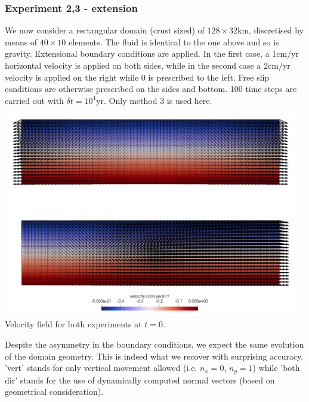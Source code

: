 \subsubsection*{Experiment 2,3 - extension}

We now consider a rectangular domain (crust sized) of $128\times32$km, discretised by means of $40\times10$ elements.
The fluid is identical to the one above and so is gravity. 
Extensional boundary conditions are applied. In the first case, a 1cm/yr horizontal velocity is applied on both sides, while in the second case a 2cm/yr velocity is applied on the right while 0 is prescribed to the left. Free slip conditions are otherwise prescribed on the sides and bottom. 100 time steps are carried out with $\delta t=10^4$yr. Only method 3 is used here.

\begin{center}
\includegraphics[width=13cm]{python_codes/fieldstone_54/images/exp2-3/vel0}\\
{\captionfont Velocity field for both experiments at $t=0$.}
\end{center}


Despite the asymmetry in the boundary conditions, we expect the same evolution of the domain geometry. This is indeed what we recover with surprising accuracy. 'vert' stands for only vertical movement allowed (i.e. $n_x=0$, 
$n_y=1$) while 'both dir' stands for the use of dynamically computed normal vectors (based on geometrical consideration).

